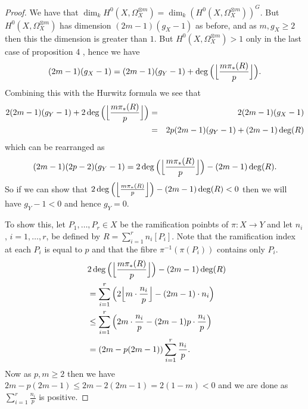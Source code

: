 \documentclass[11pt]{article} %
\begin{document}
\begin{proof}
	We have that $\dim_kH^0(X,\Omega_X^{\otimes m})=\dim_k(H^0(X,\Omega_X^{\otimes m}))^G$. 
	But $H^0(X,\Omega_X^{\otimes m})$ has dimension $(2m-1)(g_X-1)$ as before, and as $m,g_X\geq 2$ then this the 
	dimension is greater than $1$. But $H^0(X,\Omega_X^{\otimes m})>1$ only in the last case of proposition 4
	, hence we have
		\begin{equation*}
			(2m-1)(g_X-1)=(2m-1)(g_Y-1)+\deg\Big(\Big{\lfloor}\frac{m\pi_*(R)}{p}\Big{\rfloor}\Big).
		\end{equation*}
	Combining this with the Hurwitz formula we see that
		\begin{eqnarray*}
			2(2m-1)(g_Y-1)+2\deg\Big(\Big{\lfloor}\frac{m\pi_*(R)}{p}\Big{\rfloor}\Big) & = & 2(2m-1)(g_X-1)\\
			& = & 2p(2m-1)(g_Y-1)+(2m-1)\deg(R)
		\end{eqnarray*}
	which can be rearranged as
		\begin{equation*}
			(2m-1)(2p-2)(g_Y-1)=2\deg\Big(\Big{\lfloor}\frac{m\pi_*(R)}{p}\Big{\rfloor}\Big)-(2m-1)\deg(R).
		\end{equation*}
	So if we can show that $2\deg\Big(\Big{\lfloor}\frac{m\pi_*(R)}{p}\Big{\rfloor}\Big)-(2m-1)\deg(R)<0$ 
	then we will have $g_Y-1<0$ and hence $g_Y=0$.

	To show this, let $P_1,\ldots ,P_r\in X$ be the ramification poinbts of $\pi:X\rightarrow Y$ and let $n_i$, 
	$i=1,\ldots ,r$, be defined by $R=\sum_{i=1}^rn_i[P_i]$. Note that the ramification 
	index at each $P_i$ is equal to $p$ and that the fibre $\pi^{-1}(\pi(P_i))$ contains only $P_i$.
		\begin{eqnarray*}
			\lefteqn{2\deg\Big(\Big{\lfloor}\frac{m\pi_*(R)}{p}\Big{\rfloor}\Big)-(2m-1)\deg(R)}\\
			&=\sum_{i=1}^r\Big(2\Big{\lfloor}m\cdot \frac{n_i}{p}\Big{\rfloor}-(2m-1)\cdot n_i\Big) \\
			&\leq  \sum_{i=1}^r\Big(2m\cdot\frac{n_i}{p}-(2m-1)p\cdot\frac{n_i}{p}\Big) \\
			& =  (2m-p(2m-1))\sum_{i=1}^r\frac{n_i}{p}.
		\end{eqnarray*}
	Now as $p,m\geq 2$ then we have $2m-p(2m-1)\leq 2m-2(2m-1)=2(1-m)<0$ and we are done as 
	$\sum_{i=1}^r\frac{n_i}{p}$ is positive.

  

\end{proof}






\end{document}

